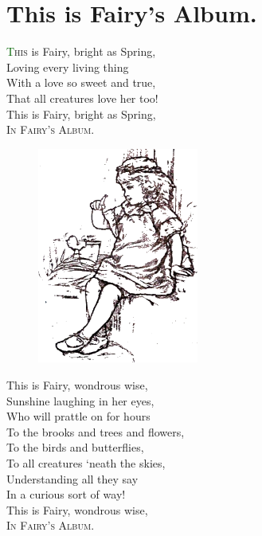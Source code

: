 \documentclass[oneside,12pt,english]{book}
\newcommand*\initfamily{\usefont{U}{Acorn}{xl}{n}}
\begin{document}
\begin{titlepage}
  
  \thispagestyle{empty}
\end{titlepage}


\newpage
\setcounter{page}{3}

\section*{This is Fairy's Album.}

\lettrine[lines=3]{\initfamily\textcolor{darkgreen}{T}}{his} is Fairy, bright as
Spring,\\
Loving every living thing\\
With a love so sweet and true,\\
That all creatures love her too!\\
This is Fairy, bright as Spring,\\
\textsc{In Fairy's Album}.

\begin{figure}
\centering
\includegraphics[height=2.8in]{fig01.png}
\end{figure}

This is Fairy, wondrous wise,\\
Sunshine laughing in her eyes,\\
Who will prattle on for hours\\
To the brooks and trees and flowers,\\
To the birds and butterflies,\\
To all creatures `neath the skies,\\
Understanding all they say\\
In a curious sort of way!\\
This is Fairy, wondrous wise,\\
\textsc{In Fairy's Album}.
\end{document}
